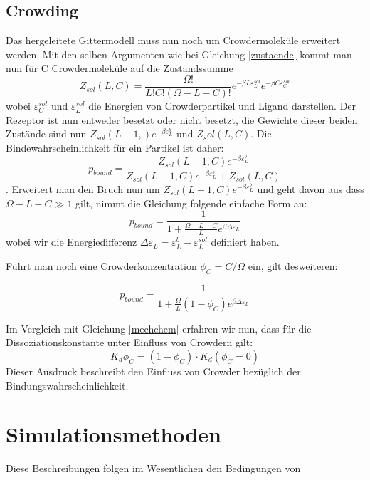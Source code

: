 \documentclass[bachelor,       %
               twoside,        %
               BCOR10mm,       %
               english,ngerman, %
               ]{GAUBM}
\begin{document}
\subsection{Crowding}
Das hergeleitete Gittermodell muss nun noch um Crowdermoleküle erweitert werden.
Mit den selben Argumenten wie bei Gleichung \ref{zustaende} kommt man nun für C Crowdermoleküle auf die Zustandssumme
\begin{equation}
Z_{sol}(L,C) = \frac{\Omega!}{L!C!(\Omega-L-C)!}e^{-\beta L\varepsilon_L^{sol}}e^{-\beta C\varepsilon_C^{sol}}
\end{equation}
wobei $\varepsilon_C^{sol}$ und $\varepsilon_L^{sol}$ die Energien von Crowderpartikel und Ligand darstellen.
Der Rezeptor ist nun entweder besetzt oder nicht besetzt, die Gewichte dieser beiden Zustände sind nun
$Z_{sol}(L-1,)e^{-\beta\varepsilon_L^b}$ und $Z_sol(L,C)$. Die Bindewahrscheinlichkeit für ein Partikel ist daher:
\begin{equation}
p_{bound} = \frac{Z_{sol}(L-1,C)e^{-\beta\varepsilon_L^b}}{Z_{sol}(L-1,C)e^{-\beta\varepsilon_L^b}+Z_{sol}(L,C)}
\end{equation}.
Erweitert man den Bruch nun um $Z_{sol}(L-1,C)e^{-\beta\varepsilon_L^b}$ und geht davon aus dass
$\Omega-L-C \gg 1$ gilt, nimmt die Gleichung folgende einfache Form an:
\begin{equation}
p_{bound} = \frac{1}{1+\frac{\Omega-L-C}{L}e^{\beta\Delta\varepsilon_L}}
\end{equation}
wobei wir die Energiedifferenz $\Delta\varepsilon_L = \varepsilon_L^b - \varepsilon_L^{sol}$ definiert haben.

Führt man noch eine Crowderkonzentration $\phi_C = C/\Omega$ ein, gilt desweiteren:

\begin{equation}
p_{bound} = \frac{1}{1+\frac{\Omega}{L}(1-\phi_C)e^{\beta\Delta\varepsilon_L}}
\end{equation}

Im Vergleich mit Gleichung \ref{mechchem} erfahren wir nun, dass für die Dissoziationskonstante unter
Einfluss von Crowdern gilt:
\begin{equation}
K_d{\phi_C} = (1-\phi_C)\cdot K_d(\phi_C = 0)
\end{equation}
Dieser Ausdruck beschreibt den Einfluss von Crowder bezüglich der Bindungswahrscheinlichkeit.



\section{Simulationsmethoden}
Diese Beschreibungen folgen im Wesentlichen den Bedingungen von \cite{frontphy}
\end{document}
